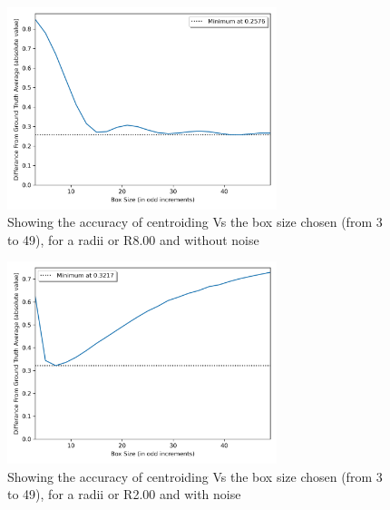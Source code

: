 \documentclass[aps,pra,a4paper,nofootinbib,onecolumn,tightenlines,longbibliography,12pt,amsfonts,amssymb,amsmath,floatfix]{revtex4-2} %
\begin{document}
 \begin{figure}[H]
   \begin{center}
     \includegraphics[width=0.7\textwidth]{project_pics/box_size_var_r8.png}
   \end{center}
   \caption{Showing the accuracy of centroiding Vs the box size chosen (from 3 to 49), for a radii or R8.00 and without noise}
   \label{fig:box_size_var_r8}
 \end{figure}

 \begin{figure}[H]
   \begin{center}
     \includegraphics[width=0.7\textwidth]{project_pics/box_size_var_noise_r2.png}
   \end{center}
   \caption{Showing the accuracy of centroiding Vs the box size chosen (from 3 to 49), for a radii or R2.00 and with noise}
   \label{fig:box_size_var_noise_r2}
 \end{figure}
  
\end{document}
